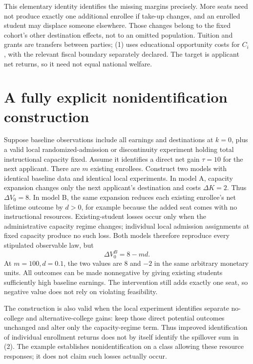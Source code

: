 \documentclass[11pt,a4paper]{article}
\begin{document}
This elementary identity identifies the missing margins precisely. More seats need not produce exactly one additional enrollee if take-up changes, and an enrolled student may displace someone elsewhere. Those changes belong to the fixed cohort's other destination effects, not to an omitted population. Tuition and grants are transfers between parties; (1) uses educational opportunity costs for $C_i$, with the relevant fiscal boundary separately declared. The target is applicant net returns, so it need not equal national welfare.

\section{A fully explicit nonidentification construction}
Suppose baseline observations include all earnings and destinations at $k=0$, plus a valid local randomized-admission or discontinuity experiment holding total instructional capacity fixed. Assume it identifies a direct net gain $\tau=10$ for the next applicant. There are $m$ existing enrollees. Construct two models with identical baseline data and identical local experiments. In model A, capacity expansion changes only the next applicant's destination and costs $\Delta K=2$. Thus $\Delta V_0=8$. In model B, the same expansion reduces each existing enrollee's net lifetime outcome by $d>0$, for example because the added seat comes with no instructional resources. Existing-student losses occur only when the administrative capacity regime changes; individual local admission assignments at fixed capacity produce no such loss. Both models therefore reproduce every stipulated observable law, but
\[
 \Delta V_0^{B}=8-md.                                     \tag{3}
\]
At $m=100,d=0.1$, the two values are $8$ and $-2$ in the same arbitrary monetary units. All outcomes can be made nonnegative by giving existing students sufficiently high baseline earnings. The intervention still adds exactly one seat, so negative value does not rely on violating feasibility.

The construction is also valid when the local experiment identifies separate no-college and alternative-college gains: keep those direct potential outcomes unchanged and alter only the capacity-regime term. Thus improved identification of individual enrollment returns does not by itself identify the spillover sum in (2). The example establishes nonidentification on a class allowing these resource responses; it does not claim such losses actually occur.
\end{document}
